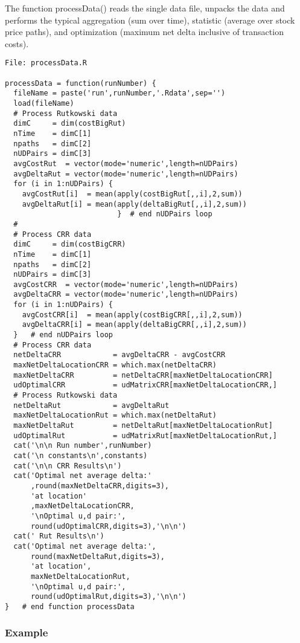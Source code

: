 \documentclass[10pt]{article}
\begin{document}
The function processData() reads the single data file, unpacks the data
and performs the typical aggregation (sum over time), statistic (average
over stock price paths), and optimization (maximum net delta inclusive of
transaction costs).

\begin{verbatim}
File: processData.R

processData = function(runNumber) {
  fileName = paste('run',runNumber,'.Rdata',sep='')
  load(fileName)
  # Process Rutkowski data
  dimC     = dim(costBigRut)
  nTime    = dimC[1]
  npaths   = dimC[2]
  nUDPairs = dimC[3]
  avgCostRut  = vector(mode='numeric',length=nUDPairs)
  avgDeltaRut = vector(mode='numeric',length=nUDPairs)
  for (i in 1:nUDPairs) {
    avgCostRut[i]  = mean(apply(costBigRut[,,i],2,sum))
    avgDeltaRut[i] = mean(apply(deltaBigRut[,,i],2,sum))
                          }  # end nUDPairs loop
  #
  # Process CRR data
  dimC     = dim(costBigCRR)
  nTime    = dimC[1]
  npaths   = dimC[2]
  nUDPairs = dimC[3]
  avgCostCRR  = vector(mode='numeric',length=nUDPairs)
  avgDeltaCRR = vector(mode='numeric',length=nUDPairs)
  for (i in 1:nUDPairs) {
    avgCostCRR[i]  = mean(apply(costBigCRR[,,i],2,sum))
    avgDeltaCRR[i] = mean(apply(deltaBigCRR[,,i],2,sum))
  }   # end nUDPairs loop
  # Process CRR data
  netDeltaCRR            = avgDeltaCRR - avgCostCRR
  maxNetDeltaLocationCRR = which.max(netDeltaCRR)
  maxNetDeltaCRR         = netDeltaCRR[maxNetDeltaLocationCRR]
  udOptimalCRR           = udMatrixCRR[maxNetDeltaLocationCRR,]
  # Process Rutkowski data
  netDeltaRut            = avgDeltaRut
  maxNetDeltaLocationRut = which.max(netDeltaRut)
  maxNetDeltaRut         = netDeltaRut[maxNetDeltaLocationRut]
  udOptimalRut           = udMatrixRut[maxNetDeltaLocationRut,]
  cat('\n\n Run number',runNumber)
  cat('\n constants\n',constants)
  cat('\n\n CRR Results\n')
  cat('Optimal net average delta:'
      ,round(maxNetDeltaCRR,digits=3),
      'at location'
      ,maxNetDeltaLocationCRR,
      '\nOptimal u,d pair:',
      round(udOptimalCRR,digits=3),'\n\n')
  cat(' Rut Results\n')
  cat('Optimal net average delta:',
      round(maxNetDeltaRut,digits=3),
      'at location',
      maxNetDeltaLocationRut,
      '\nOptimal u,d pair:',
      round(udOptimalRut,digits=3),'\n\n')
}   # end function processData
\end{verbatim}
 \subsubsection*{Example}
\end{document}
